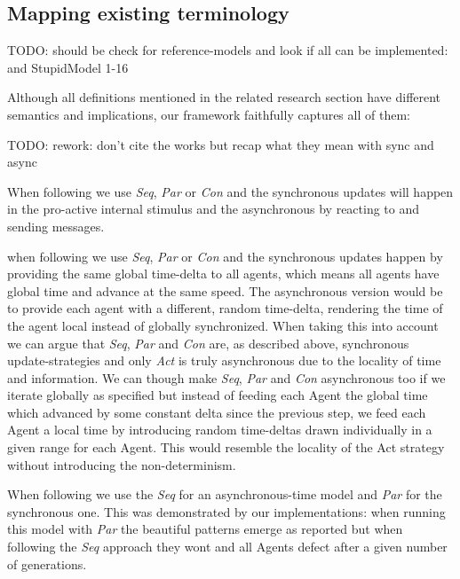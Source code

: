  	
\subsection{Mapping existing terminology}
TODO: should be check for reference-models and look if all can be implemented: \cite{isaac_abm_2011} and StupidModel 1-16


Although all definitions mentioned in the related research section have different semantics and implications, our framework faithfully captures all of them:

TODO: rework: don't cite the works but recap what they mean with sync and async

When following \cite{yuxuan_agent-based_2016} we use \textit{Seq}, \textit{Par} or \textit{Con} and the synchronous updates will happen in the pro-active internal stimulus and the asynchronous by reacting to and sending messages.

when following \cite{dawson_opening_2014} we use \textit{Seq}, \textit{Par} or \textit{Con} and the synchronous updates happen by providing the same global time-delta to all agents, which means all agents have global time and advance at the same speed. The asynchronous version would be to provide each agent with a different, random time-delta, rendering the time of the agent local instead of globally synchronized. When taking this into account we can argue that \textit{Seq}, \textit{Par} and \textit{Con} are, as described above, synchronous update-strategies and only \textit{Act} is truly asynchronous due to the locality of time and information. We can though make \textit{Seq}, \textit{Par} and \textit{Con} asynchronous too if we iterate globally as specified but instead of feeding each Agent the global time which advanced by some constant delta since the previous step, we feed each Agent a local time by introducing random time-deltas drawn individually in a given range for each Agent. This would resemble the locality of the Act strategy without introducing the non-determinism.

When following \cite{huberman_evolutionary_1993} we use the \textit{Seq} for an asynchronous-time model and \textit{Par} for the synchronous one. This was demonstrated by our implementations: when running this model with \textit{Par} the beautiful patterns emerge as reported but when following the \textit{Seq} approach they wont and all Agents defect after a given number of generations.

